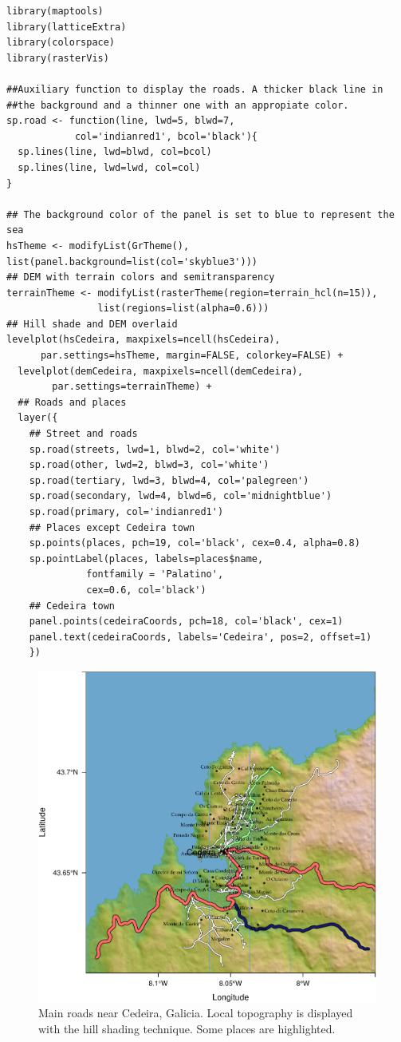 \lstset{language=R,numbers=none}
\begin{lstlisting}
library(maptools)
library(latticeExtra)
library(colorspace)
library(rasterVis)

##Auxiliary function to display the roads. A thicker black line in
##the background and a thinner one with an appropiate color.
sp.road <- function(line, lwd=5, blwd=7,
		    col='indianred1', bcol='black'){
  sp.lines(line, lwd=blwd, col=bcol)
  sp.lines(line, lwd=lwd, col=col)
}

## The background color of the panel is set to blue to represent the sea
hsTheme <- modifyList(GrTheme(), list(panel.background=list(col='skyblue3')))
## DEM with terrain colors and semitransparency
terrainTheme <- modifyList(rasterTheme(region=terrain_hcl(n=15)),
				list(regions=list(alpha=0.6)))
## Hill shade and DEM overlaid
levelplot(hsCedeira, maxpixels=ncell(hsCedeira),
	  par.settings=hsTheme, margin=FALSE, colorkey=FALSE) +
  levelplot(demCedeira, maxpixels=ncell(demCedeira),
	    par.settings=terrainTheme) +
  ## Roads and places
  layer({
    ## Street and roads
    sp.road(streets, lwd=1, blwd=2, col='white')
    sp.road(other, lwd=2, blwd=3, col='white')
    sp.road(tertiary, lwd=3, blwd=4, col='palegreen')
    sp.road(secondary, lwd=4, blwd=6, col='midnightblue')
    sp.road(primary, col='indianred1')
    ## Places except Cedeira town
    sp.points(places, pch=19, col='black', cex=0.4, alpha=0.8)
    sp.pointLabel(places, labels=places$name,
		      fontfamily = 'Palatino', 
		      cex=0.6, col='black')
    ## Cedeira town
    panel.points(cedeiraCoords, pch=18, col='black', cex=1)
    panel.text(cedeiraCoords, labels='Cedeira', pos=2, offset=1)
    })
\end{lstlisting}

\begin{figure}[htb]
\centering
\includegraphics[width=.9\linewidth]{figs/cedeiraOsmar.pdf}
\caption{\label{fig:cedeiraOsmar}Main roads near Cedeira, Galicia. Local topography is displayed with the hill shading technique. Some places are highlighted.}
\end{figure}

